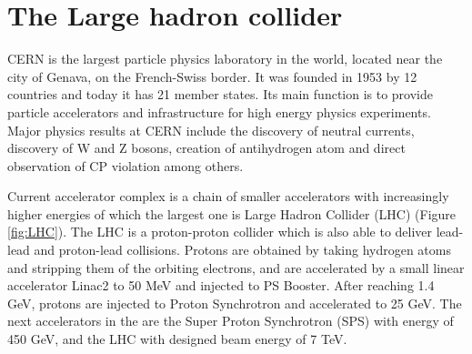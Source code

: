 \chapter{The Large hadron collider} %

\label{Chapter3} %


CERN is the largest particle physics laboratory in the world, located near the city of Genava, on the French-Swiss border. It was founded in 1953 by 12 countries and today it has 21 member states. Its main function is to provide particle accelerators and infrastructure for high energy physics experiments. Major physics results at CERN include the discovery of neutral currents, discovery of W and Z bosons, creation of antihydrogen atom and direct observation of CP violation among others.
\par Current accelerator complex is a chain of smaller accelerators with increasingly higher energies of which the largest one is Large Hadron Collider (LHC) (Figure \ref{fig:LHC}). The LHC is a proton-proton collider which is also able to deliver lead-lead and proton-lead collisions. Protons are obtained by taking hydrogen atoms and stripping them of the orbiting electrons, and are accelerated by a small linear accelerator Linac2 to 50 MeV and injected to PS Booster. After reaching 1.4 GeV, protons are injected to Proton Synchrotron and accelerated to 25 GeV. The next accelerators in the are the Super Proton Synchrotron (SPS) with energy of 450 GeV, and the LHC with designed beam energy of 7 TeV. 
 
